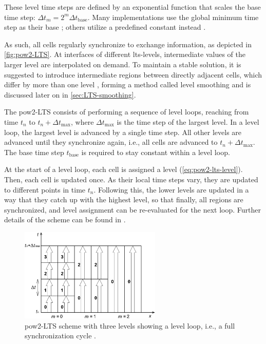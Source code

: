 These level time steps are defined by an exponential function that scales the base time step: $\Delta t_m = 2^m \Delta t_{\mathrm{base}}$. 
Many implementations use the global minimum time step as their base \autocite{kleb1992,crossley2003,dazzi2018,yang2020}; others utilize a predefined constant instead \autocite{sanders2008}.

As such, all cells regularly synchronize to exchange information, as depicted in \autoref{fig:pow2-LTS}.
At interfaces of different \gls{lts}-levels, intermediate values of the larger level are interpolated on demand.
To maintain a stable solution, it is suggested to introduce intermediate regions between directly adjacent cells, which differ by more than one level \autocite{crossley2003}, forming a method called level smoothing and is discussed later on in \autoref{sec:LTS-smoothing}.

The \gls{pow2-LTS} consists of performing a sequence of level loops, reaching from time $t_n$ to $t_n + \Delta t_{\max}$, where $\Delta t_{\max}$ is the time step of the largest level. 
In a level loop, the largest level is advanced by a single time step. 
All other levels are advanced until they synchronize again, i.e., all cells are advanced to $t_n + \Delta t_{\max}$.
The base time step $t_{\mathrm{base}}$ is required to stay constant within a level loop.

At the start of a level loop, each cell is assigned a level (\autoref{eq:pow2-lts-level}).
Then, each cell is updated once. As their local time steps vary, they are updated to different points in time $t_n$.
Following this, the lower levels are updated in a way that they catch up with the highest level, so that finally, all regions are synchronized, and level assignment can be re-evaluated for the next loop.
Further details of the scheme can be found in \textcite{kleb1992,crossley2003}.

\begin{figure}[htbp]
	\centering
	\includegraphics[width=0.6\textwidth]{img/dazzi2018_fig3.jpg}
	\caption[\Acrlong{pow2-LTS} scheme]{
		\Acrlong{pow2-LTS} scheme with three levels showing a level loop, i.e., a full synchronization cycle \autocite{dazzi2018}.
	}
	\label{fig:pow2-LTS}
\end{figure}


